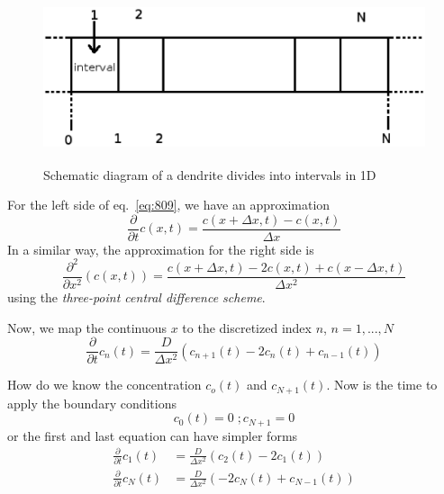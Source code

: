 \begin{figure}[hbt]
 \centerline{\includegraphics[height=5cm, angle=0]{./images/cell_1D.eps}}
\caption{Schematic diagram of a dendrite divides into intervals in 1D}
\label{fig:cell_1D}
\end{figure}

For the left side of eq.~\eqref{eq:809}, we have an approximation
\begin{equation}
  \label{eq:812}
  \frac{\partial}{\partial t} c(x,t) = \frac{c(x+\Delta x,t) -
    c(x,t)}{\Delta x}
\end{equation}
In a similar way, the approximation for the right side is
\begin{equation}
  \label{eq:813}
  \frac{\partial^2}{\partial x^2} \left(c(x,t) \right)  
  = \frac{c(x+\Delta x,t) - 2c(x,t) + c(x-\Delta
    x,t)}{\Delta x^2}
\end{equation}
using the {\it three-point central difference scheme}. 

Now, we map the continuous $x$ to the discretized index $n$,
$n=1,...,N$
\begin{equation}
  \label{eq:814}
  \frac{\partial }{\partial t} c_n(t) = \frac{D}{\Delta
    x^2}(c_{n+1}(t)-2c_n(t) + c_{n-1}(t))
\end{equation}

How do we know the concentration $c_o(t)$ and $c_{N+1}(t)$.  Now is
the time to apply the boundary conditions
\begin{equation}
  \label{eq:815}
  c_0(t) = 0 \; ; c_{N+1} = 0 
\end{equation}
or the first and last equation can have simpler forms 
\begin{equation}
  \label{eq:816}
  \begin{split}
    \frac{\partial }{\partial t} c_1(t) &= \frac{D}{\Delta
      x^2}(c_{2}(t)-2c_1(t)) \\
    \frac{\partial }{\partial t} c_N(t) &= \frac{D}{\Delta
      x^2}(-2c_N(t) + c_{N-1}(t))    
  \end{split}
\end{equation}

